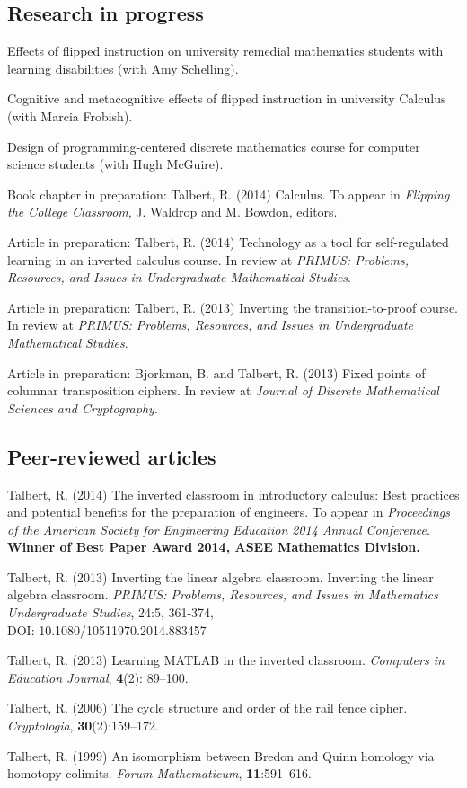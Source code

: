 \documentclass[letterpaper]{article}
\renewenvironment{itemize}{
  \begin{list}{}{
    \setlength{\leftmargin}{1.5em}
	\setlength{\itemsep}{0in}
  }
}{
  \end{list}
}
\begin{document}
\subsection*{Research in progress}
\begin{itemize}
	\item Effects of flipped instruction on university remedial mathematics students with learning disabilities (with Amy Schelling). 
	\item Cognitive and metacognitive effects of flipped instruction in university Calculus (with Marcia Frobish). 
	\item Design of programming-centered discrete mathematics course for computer science students (with Hugh McGuire). 
	\item Book chapter in preparation: Talbert, R. (2014) Calculus. To appear in \emph{Flipping the College Classroom}, J. Waldrop and M. Bowdon, editors. 
	\item Article in preparation: Talbert, R. (2014) Technology as a tool for self-regulated learning in an inverted calculus course. In review at \emph{PRIMUS: Problems, Resources, and Issues in Undergraduate Mathematical Studies}. 
	\item Article in preparation: Talbert, R. (2013) Inverting the transition-to-proof course. In review at \emph{PRIMUS: Problems, Resources, and Issues in Undergraduate Mathematical Studies}. 
	\item Article in preparation: Bjorkman, B. and Talbert, R. (2013) Fixed points of columnar transposition ciphers. In review at \emph{Journal of Discrete Mathematical Sciences and Cryptography}.
\end{itemize}


\subsection*{Peer-reviewed articles}

\begin{itemize}
\item Talbert, R. (2014) The inverted classroom in introductory calculus: Best practices and potential benefits for the preparation of engineers. To appear in \emph{Proceedings of the American Society for Engineering Education 2014 Annual Conference}.  \textbf{Winner of Best Paper Award 2014, ASEE Mathematics Division.}
\item Talbert, R. (2013) Inverting the linear algebra classroom. Inverting the linear algebra classroom. \emph{PRIMUS: Problems, Resources, and Issues in Mathematics Undergraduate Studies}, 24:5, 361-374, \\ DOI: 10.1080/10511970.2014.883457
\item Talbert, R. (2013) Learning MATLAB in the inverted classroom. \emph{Computers in Education Journal}, \textbf{4}(2): 89--100.  
\item Talbert, R. (2006) The cycle structure and order of the rail fence cipher. \emph{Cryptologia}, \textbf{30}(2):159--172. 
\item Talbert, R. (1999) An isomorphism between Bredon and Quinn homology via homotopy colimits. \emph{Forum Mathematicum}, \textbf{11}:591--616. 
\end{itemize}
\end{document}
